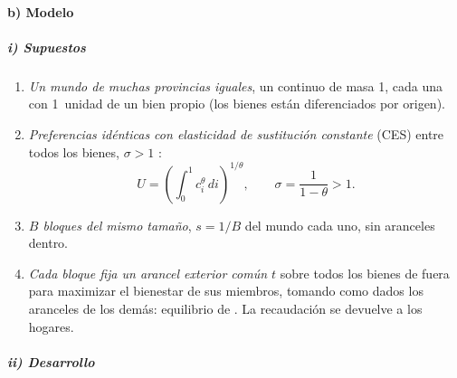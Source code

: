 \documentclass[11pt]{article}
\begin{document}
\paragraph{b) Modelo}

\subparagraph{i) Supuestos}

\begin{enumerate}
\item \emph{Un mundo de muchas provincias iguales}, un continuo de masa 1, cada una con 1~unidad de un bien propio (los bienes están diferenciados por origen).
\item \emph{Preferencias idénticas con elasticidad de sustitución constante} (CES) entre todos los bienes, $\sigma>1$ :
  $$U=\left(\int_0^1 c_i^{\theta}\,di\right)^{1/\theta},\qquad \sigma=\frac{1}{1-\theta}>1.$$
\item \emph{$B$ bloques del mismo tamaño}, $s=1/B$ del mundo cada uno, sin aranceles dentro.
\item \emph{Cada bloque fija un arancel exterior común $t$} sobre todos los bienes de fuera para maximizar el bienestar de sus miembros, tomando como dados los aranceles de los demás: equilibrio de  . La recaudación se devuelve a los hogares.
\end{enumerate}

\subparagraph{ii) Desarrollo}
\end{document}
